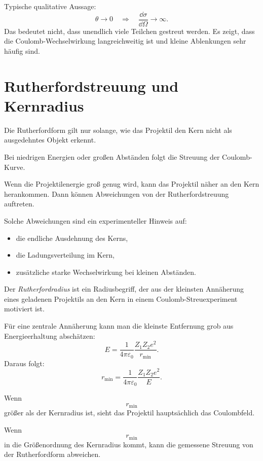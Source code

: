 \begin{examtipbox}
Typische qualitative Aussage:
\[
    \theta \to 0
    \quad\Rightarrow\quad
    \frac{\dd\sigma}{\dd\Omega}\to \infty.
\]
Das bedeutet nicht, dass unendlich viele Teilchen gestreut werden.
Es zeigt, dass die Coulomb-Wechselwirkung langreichweitig ist und kleine Ablenkungen
sehr häufig sind.
\end{examtipbox}

\section{Rutherfordstreuung und Kernradius}

Die Rutherfordform gilt nur solange, wie das Projektil den Kern nicht als ausgedehntes
Objekt erkennt.

\begin{conceptbox}
Bei niedrigen Energien oder großen Abständen folgt die Streuung der Coulomb-Kurve.

Wenn die Projektilenergie groß genug wird, kann das Projektil näher an den Kern
herankommen.
Dann können Abweichungen von der Rutherfordstreuung auftreten.

Solche Abweichungen sind ein experimenteller Hinweis auf:
\begin{itemize}
    \item die endliche Ausdehnung des Kerns,
    \item die Ladungsverteilung im Kern,
    \item zusätzliche starke Wechselwirkung bei kleinen Abständen.
\end{itemize}
\end{conceptbox}

\begin{definitionbox}
Der \emph{Rutherfordradius} ist ein Radiusbegriff, der aus der kleinsten Annäherung
eines geladenen Projektils an den Kern in einem Coulomb-Streuexperiment motiviert ist.
\end{definitionbox}

\begin{formulabox}
Für eine zentrale Annäherung kann man die kleinste Entfernung grob aus Energieerhaltung
abschätzen:
\[
    E
    =
    \frac{1}{4\pi\varepsilon_0}
    \frac{Z_1Z_2e^2}{r_{\min}}.
\]
Daraus folgt:
\[
    r_{\min}
    =
    \frac{1}{4\pi\varepsilon_0}
    \frac{Z_1Z_2e^2}{E}.
\]
\end{formulabox}

\begin{conceptbox}
Wenn
\[
    r_{\min}
\]
größer als der Kernradius ist, sieht das Projektil hauptsächlich das Coulombfeld.

Wenn
\[
    r_{\min}
\]
in die Größenordnung des Kernradius kommt, kann die gemessene Streuung von der
Rutherfordform abweichen.
\end{conceptbox}

